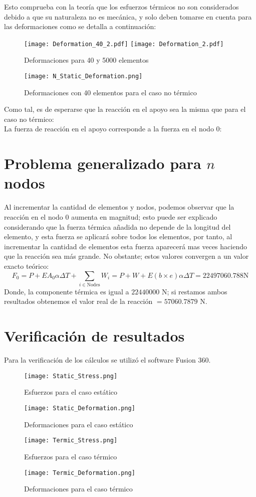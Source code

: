 \documentclass[10pt,a4paper]{article}
\begin{document}
Esto comprueba con la teoría que los esfuerzos térmicos no son considerados debido a que su naturaleza no es mecánica, y solo deben tomarse en cuenta para las deformaciones como se detalla a continuación:
\begin{figure}[H]
    \centering
    \texttt{[image: Deformation\_40\_2.pdf]}
    \texttt{[image: Deformation\_2.pdf]}
    \caption{Deformaciones para 40 y 5000 elementos}
\end{figure}
\begin{figure}[H]
    \centering
    \texttt{[image: N\_Static\_Deformation.png]}
    \caption{Deformaciones con 40 elementos para el caso no térmico}
\end{figure}
Como tal, es de esperarse que la reacción en el apoyo sea la misma que para el caso no térmico:\\
La fuerza de reacción en el apoyo corresponde a la fuerza en el nodo 0: 

\section{Problema generalizado para $n$ nodos}
Al incrementar la cantidad de elementos y nodos, podemos observar que la reacción en el nodo 0 aumenta en magnitud; esto puede ser explicado considerando que la fuerza térmica añadida no depende de la longitud del elemento, y esta fuerza se aplicará sobre todos los elementos, por tanto, al incrementar la cantidad de elementos esta fuerza aparecerá mas veces haciendo que la reacción sea más grande. No obstante; estos valores convergen a un valor exacto teórico:
\begin{equation}
    F_{0} = P + EA_{0}\alpha \Delta T + \sum_{i \in \mathrm{Nodes}}  W_{i} = P + W + E(b\times e)\alpha\Delta T = 22497060.788 \mathrm{N}
\end{equation}
Donde, la componente térmica es igual a $22440000$ N; si restamos ambos resultados obtenemos el valor real de la reacción $ = 57060.7879$ N.
\section{Verificación de resultados}
Para la verificación de los cálculos se utilizó el software Fusion 360.
\begin{figure}[H]
    \centering
    \texttt{[image: Static\_Stress.png]}
    \caption{Esfuerzos para el caso estático}
    \texttt{[image: Static\_Deformation.png]}
    \caption{Deformaciones para el caso estático}
    \texttt{[image: Termic\_Stress.png]}
    \caption{Esfuerzos para el caso térmico}
    \texttt{[image: Termic\_Deformation.png]}
    \caption{Deformaciones para el caso térmico}
\end{figure}
\end{document}

